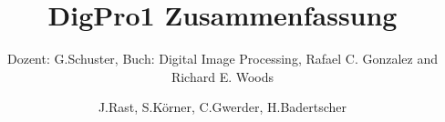 \documentclass{scrartcl}
\title{DigPro1 Zusammenfassung}
\subtitle{Dozent: G.Schuster, Buch: Digital Image Processing, Rafael C. Gonzalez and Richard E. Woods}
\author{J.Rast, S.Körner, C.Gwerder, H.Badertscher}
\numberwithin{equation}{section}
\begin{document}

\begin{titlepage}
	\maketitle
	\thispagestyle{empty}
\end{titlepage}

\newpage
\setcounter{tocdepth}{2}
\tableofcontents
\newpage




\newpage

\newpage




% 


\end{document}
